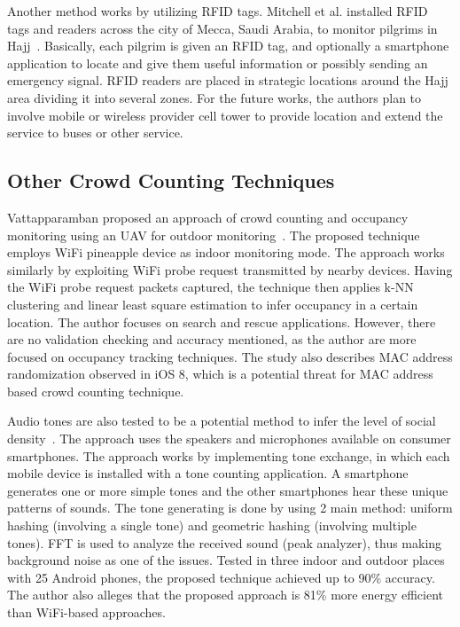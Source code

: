 	Another method works by utilizing \ac{RFID} tags. Mitchell et al. installed \ac{RFID} tags and readers across the city of Mecca, Saudi Arabia, to monitor pilgrims in Hajj~\cite{thesis050}. Basically, each pilgrim is given an \ac{RFID} tag, and optionally a smartphone application to locate and give them useful information or possibly sending an emergency signal. \ac{RFID} readers are placed in strategic locations around the Hajj area dividing it into several zones. For the future works, the authors plan to involve mobile or wireless provider cell tower to provide location and extend the service to buses or other service.









	\subsection{Other Crowd Counting Techniques} %
	\label{sub:other_crowd_counting_techniques}
	Vattapparamban proposed an approach of crowd counting and occupancy monitoring using an \ac{UAV} for outdoor monitoring~\cite{thesis053}. The proposed technique employs WiFi pineapple device as indoor monitoring mode. The approach works similarly by exploiting WiFi probe request transmitted by nearby devices. Having the WiFi probe request packets captured, the technique then applies \ac{k-NN} clustering and linear least square estimation to infer occupancy in a certain location. The author focuses on search and rescue applications. However, there are no validation checking and accuracy mentioned, as the author are more focused on occupancy tracking techniques. The study also describes \ac{MAC} address randomization observed in iOS 8, which is a potential threat for \ac{MAC} address based crowd counting technique.

	Audio tones are also tested to be a potential method to infer the level of social density~\cite{thesis044}. The approach uses the speakers and microphones available on consumer smartphones. The approach works by implementing tone exchange, in which each mobile device is installed with a tone counting application. A smartphone generates one or more simple tones and the other smartphones hear these unique patterns of sounds. The tone generating is done by using 2 main method: uniform hashing (involving a single tone) and geometric hashing (involving multiple tones). \ac{FFT} is used to analyze the received sound (peak analyzer), thus making background noise as one of the issues. Tested in three indoor and outdoor places with 25 Android phones, the proposed technique achieved up to 90\% accuracy. The author also alleges that the proposed approach is 81\% more energy efficient than WiFi-based approaches.

